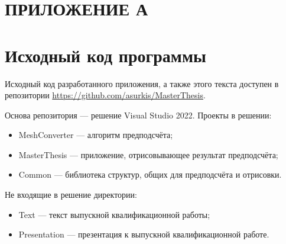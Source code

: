 \clearpage
\section*{ПРИЛОЖЕНИЕ А}
\section[ПРИЛОЖЕНИЕ А (Исходный код программы)]{Исходный код программы}\label{sec:source-code}
Исходный код разработанного приложения, а также этого текста доступен в репозитории \url{https://github.com/asurkis/MasterThesis}.

Основа репозитория --- решение Visual Studio 2022.
Проекты в решении:
\begin{itemize}
    \item MeshConverter --- алгоритм предподсчёта;
    \item MasterThesis --- приложение, отрисовывающее результат предподсчёта;
    \item Common --- библиотека структур, общих для предподсчёта и отрисовки.
\end{itemize}

Не входящие в решение директории:
\begin{itemize}
    \item Text --- текст выпускной квалификационной работы;
    \item Presentation --- презентация к выпускной квалификационной работе.
\end{itemize}
